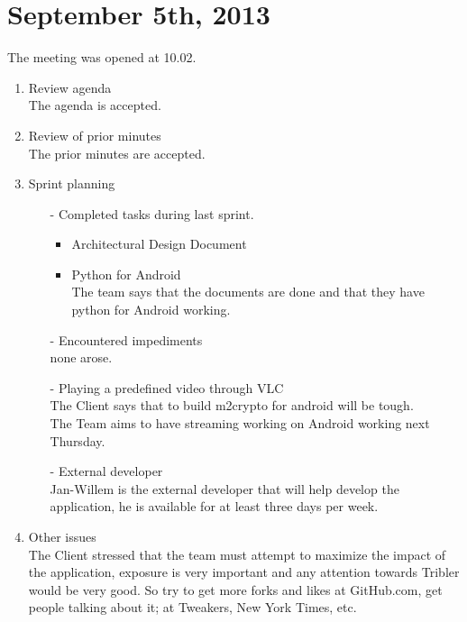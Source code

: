 \section{September 5th, 2013}

The meeting was opened at 10.02.\\
\begin{enumerate}
\item Review agenda	\\
The agenda is accepted.\\		
\item Review of prior minutes\\
The prior minutes are accepted.\\		
\item Sprint planning
\begin{enumerate}
\item[-] Completed tasks during last sprint.\\
	\begin{itemize}
	\item Architectural Design Document\\

	\item Python for Android\\
The team says that the documents are done and that they have python for Android working.
	\end{itemize}
\item[-] Encountered impediments\\
none arose.\\
\item[-] Playing a predefined video through VLC\\
The Client says that to build m2crypto for android will be tough.\\
The Team aims to have streaming working on Android working next Thursday.\\
\item[-] External developer\\
Jan-Willem is the external developer that will help develop the application, he is available for at least three days per week.

\end{enumerate}
\item Other issues\\
The Client stressed that the team must attempt to maximize the impact of the application, exposure is very important and any attention towards Tribler would be very good. So try to get more forks and likes at GitHub.com, get people talking about it; at Tweakers, New York Times, etc. \\


\end{enumerate}
